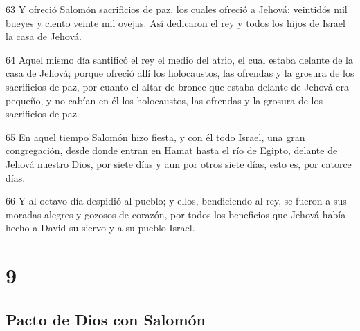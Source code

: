 \par 63 Y ofreció Salomón sacrificios de paz, los cuales ofreció a Jehová: veintidós mil bueyes y ciento veinte mil ovejas. Así dedicaron el rey y todos los hijos de Israel la casa de Jehová.
\par 64 Aquel mismo día santificó el rey el medio del atrio, el cual estaba delante de la casa de Jehová; porque ofreció allí los holocaustos, las ofrendas y la grosura de los sacrificios de paz, por cuanto el altar de bronce que estaba delante de Jehová era pequeño, y no cabían en él los holocaustos, las ofrendas y la grosura de los sacrificios de paz.
\par 65 En aquel tiempo Salomón hizo fiesta, y con él todo Israel, una gran congregación, desde donde entran en Hamat hasta el río de Egipto, delante de Jehová nuestro Dios, por siete días y aun por otros siete días, esto es, por catorce días.
\par 66 Y al octavo día despidió al pueblo; y ellos, bendiciendo al rey, se fueron a sus moradas alegres y gozosos de corazón, por todos los beneficios que Jehová había hecho a David su siervo y a su pueblo Israel.

\chapter{9}

\section*{Pacto de Dios con Salomón}

